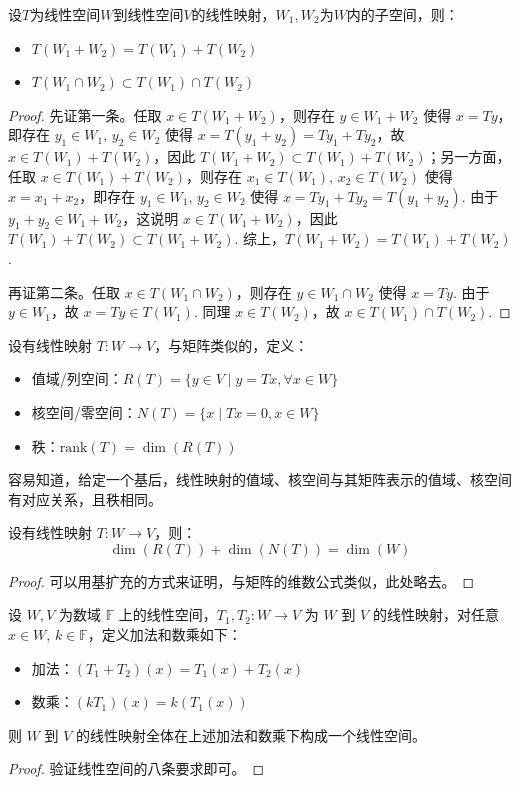 \begin{theorem}
设$T$为线性空间$W$到线性空间$V$的线性映射，$W_1,W_2$为$W$内的子空间，则：
\begin{itemize}
    \item $T(W_1+W_2)=T(W_1)+T(W_2)$
    \item $T(W_1\cap W_2)\subset T(W_1)\cap T(W_2)$
\end{itemize}
\end{theorem}
\begin{proof}
先证第一条。任取 $x\in T(W_1+W_2)$，则存在 $y\in W_1+W_2$ 使得 $x=Ty$，即存在 $y_1\in W_1,\,y_2\in W_2$ 使得 $x=T(y_1+y_2)=Ty_1+Ty_2$，故 $x\in T(W_1)+T(W_2)$，因此 $T(W_1+W_2)\subset T(W_1)+T(W_2)$；另一方面，任取 $x\in T(W_1)+T(W_2)$，则存在 $x_1\in T(W_1),\,x_2\in T(W_2)$ 使得 $x=x_1+x_2$，即存在 $y_1\in W_1,\,y_2\in W_2$ 使得 $x=Ty_1+Ty_2=T(y_1+y_2)$. 由于 $y_1+y_2\in W_1+W_2$，这说明 $x\in T(W_1+W_2)$，因此 $T(W_1)+T(W_2)\subset T(W_1+W_2)$. 综上，$T(W_1+W_2)=T(W_1)+T(W_2)$.

再证第二条。任取 $x\in T(W_1\cap W_2)$，则存在 $y\in W_1\cap W_2$ 使得 $x=Ty$. 由于 $y\in W_1$，故 $x=Ty\in T(W_1)$. 同理 $x\in T(W_2)$，故 $x\in T(W_1)\cap T(W_2)$.
\end{proof}

\begin{definition}
设有线性映射 $T:W\to V$，与矩阵类似的，定义：
\begin{itemize}
    \item 值域/列空间：$R(T)=\{y\in V\mid y=Tx,\forall x\in W\}$
    \item 核空间/零空间：$N(T)=\{x\mid Tx=0,x\in W\}$
    \item 秩：$\text{rank}(T)=\dim(R(T))$
\end{itemize}
\end{definition}

\begin{com}
容易知道，给定一个基后，线性映射的值域、核空间与其矩阵表示的值域、核空间有对应关系，且秩相同。
\end{com}

\begin{theorem}[线性映射的维数公式]
设有线性映射 $T:W\to V$，则：
\[
    \dim(R(T))+\dim(N(T))=\dim(W)
\]
\end{theorem}
\begin{proof}
可以用基扩充的方式来证明，与矩阵的维数公式类似，此处略去。
\end{proof}

\begin{theorem}[线性映射全体构成线性空间]
设 $W,V$ 为数域 $\mathbb F$ 上的线性空间，$T_1,T_2: W\to V$ 为 $W$ 到 $V$ 的线性映射，对任意 $x\in W,\,k\in\mathbb F$，定义加法和数乘如下：
\begin{itemize}
    \item 加法：$(T_1+T_2)(x)=T_1(x)+T_2(x)$
    \item 数乘：$(kT_1)(x)=k(T_1(x))$
\end{itemize}
则 $W$ 到 $V$ 的线性映射全体在上述加法和数乘下构成一个线性空间。
\end{theorem}
\begin{proof}
验证线性空间的八条要求即可。
\end{proof}

